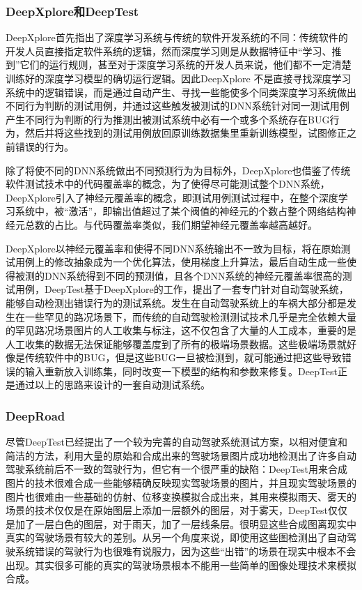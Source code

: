 \subsubsection{DeepXplore和DeepTest}
DeepXplore首先指出了深度学习系统与传统的软件开发系统的不同：传统软件的开发人员直接指定软件系统的逻辑，然而深度学习则是从数据特征中“学习、推到”它们的运行规则，甚至对于深度学习系统的开发人员来说，他们都不一定清楚训练好的深度学习模型的确切运行逻辑。因此DeepXplore
不是直接寻找深度学习系统中的逻辑错误，而是通过自动产生、寻找一些能使多个同类深度学习系统做出不同行为判断的测试用例，并通过这些触发被测试的DNN系统针对同一测试用例产生不同行为判断的行为推测出被测试系统中必有一个或多个系统存在BUG行为，然后并将这些找到的测试用例放回原训练数据集里重新训练模型，试图修正之前错误的行为。

除了将使不同的DNN系统做出不同预测行为为目标外，DeepXplore也借鉴了传统软件测试技术中的代码覆盖率的概念，为了使得尽可能测试整个DNN系统，DeepXplore引入了神经元覆盖率的概念，即测试用例测试过程中，在整个深度学习系统中，被“激活”，即输出值超过了某个阀值的神经元的个数占整个网络结构神经元总数的占比。与代码覆盖率类似，我们期望神经元覆盖率越高越好。

DeepXplore以神经元覆盖率和使得不同DNN系统输出不一致为目标，将在原始测试用例上的修改抽象成为一个优化算法，使用梯度上升算法，最后自动生成一些使得被测的DNN系统得到不同的预测值，且各个DNN系统的神经元覆盖率很高的测试用例，DeepTest基于DeepXplore的工作，提出了一套专门针对自动驾驶系统，能够自动检测出错误行为的测试系统。发生在自动驾驶系统上的车祸大部分都是发生在一些罕见的路况场景下，而传统的自动驾驶检测测试技术几乎是完全依赖大量的罕见路况场景图片的人工收集与标注，这不仅包含了大量的人工成本，重要的是人工收集的数据无法保证能够覆盖度到了所有的极端场景数据。这些极端场景就好像是传统软件中的BUG，但是这些BUG一旦被检测到，就可能通过把这些导致错误的输入重新放入训练集，同时改变一下模型的结构和参数来修复。DeepTest正是通过以上的思路来设计的一套自动测试系统。

\subsubsection{DeepRoad}

尽管DeepTest已经提出了一个较为完善的自动驾驶系统测试方案，以相对便宜和简洁的方法，利用大量的原始和合成出来的驾驶场景图片成功地检测出了许多自动驾驶系统前后不一致的驾驶行为，但它有一个很严重的缺陷：DeepTest用来合成图片的技术很难合成一些能够精确反映现实驾驶场景的图片，并且现实驾驶场景的图片也很难由一些基础的仿射、位移变换模拟合成出来，其用来模拟雨天、雾天的场景的技术仅仅是在原始图层上添加一层额外的图层，对于雾天，DeepTest仅仅是加了一层白色的图层，对于雨天，加了一层线条层。很明显这些合成图离现实中真实的驾驶场景有较大的差别。从另一个角度来说，即使用这些图检测出了自动驾驶系统错误的驾驶行为也很难有说服力，因为这些“出错”的场景在现实中根本不会出现。其实很多可能的真实的驾驶场景根本不能用一些简单的图像处理技术来模拟合成。

